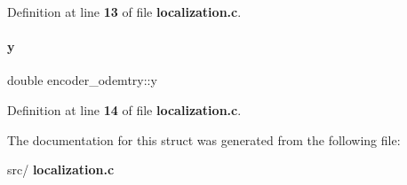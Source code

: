 Definition at line \textbf{ 13} of file \textbf{ localization.\+c}.

\mbox{\label{a00203_a955cbea800158b8c0cd5f36b253fe6bb}} 
\paragraph{y}
{\footnotesize\ttfamily double encoder\+\_\+odemtry\+::y}



Definition at line \textbf{ 14} of file \textbf{ localization.\+c}.



The documentation for this struct was generated from the following file\+:\begin{DoxyCompactItemize}
\item 
src/\textbf{ localization.\+c}\end{DoxyCompactItemize}
